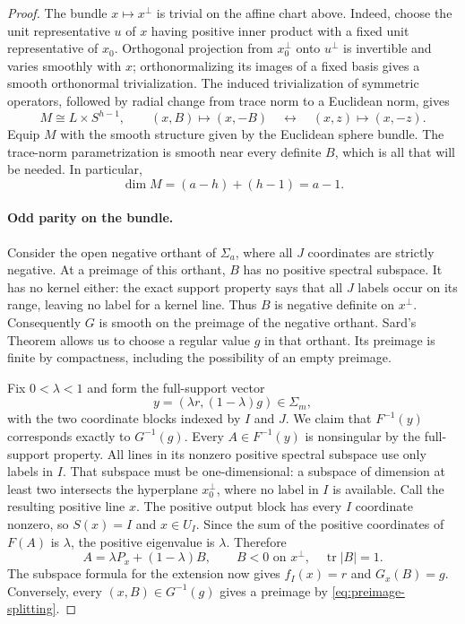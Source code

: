 \begin{proof}
The bundle $x\mapsto x^\perp$ is trivial on the affine chart above.
Indeed, choose the unit representative $u$ of $x$ having positive
inner product with a fixed unit representative of $x_0$.  Orthogonal
projection from $x_0^\perp$ onto $u^\perp$ is invertible and varies
smoothly with $x$; orthonormalizing its images of a fixed basis gives
a smooth orthonormal trivialization.  The induced trivialization
of symmetric operators, followed by radial change from trace norm
to a Euclidean norm, gives
\begin{equation}\label{eq:product-sphere-bundle}
 M\cong L\times S^{h-1},\qquad
 (x,B)\longmapsto(x,-B)\quad\leftrightarrow\quad(x,z)\longmapsto(x,-z).
\end{equation}
Equip $M$ with the smooth structure given by the Euclidean sphere
bundle.  The trace-norm parametrization is smooth near every
definite $B$, which is all that will be needed.  In particular,
\begin{equation}\label{eq:bundle-dimension}
 \dim M=(a-h)+(h-1)=a-1.
\end{equation}

\paragraph{Odd parity on the bundle.}
Consider the open negative orthant of $\Sigma_a$, where all $J$
coordinates are strictly negative.  At a preimage of this orthant,
$B$ has no positive spectral subspace.  It has no kernel either:
the exact support property says that all $J$ labels occur on its
range, leaving no label for a kernel line.  Thus $B$ is negative
definite on $x^\perp$.  Consequently $G$ is smooth on the preimage
of the negative orthant.  Sard's Theorem allows us to choose a
regular value $g$ in that orthant.  Its preimage is finite by
compactness, including the possibility of an empty preimage.

Fix $0<\lambda<1$ and form the full-support vector
\[
 y=(\lambda r,(1-\lambda)g)\in\Sigma_m,
\]
with the two coordinate blocks indexed by $I$ and $J$.  We claim
that $F^{-1}(y)$ corresponds exactly to $G^{-1}(g)$.
Every $A\in F^{-1}(y)$ is nonsingular by the full-support property.
All lines in its nonzero positive spectral subspace use only
labels in $I$.  That subspace must be one-dimensional: a subspace
of dimension at least two intersects the hyperplane $x_0^\perp$,
where no label in $I$ is available.  Call the resulting positive
line $x$.  The positive output block has every $I$ coordinate
nonzero, so $S(x)=I$ and $x\in U_I$.  Since the sum of the positive
coordinates of $F(A)$ is $\lambda$, the positive eigenvalue is
$\lambda$.  Therefore
\begin{equation}\label{eq:preimage-splitting}
 A=\lambda P_x+(1-\lambda)B,
 \qquad B<0\text{ on }x^\perp,\quad \operatorname{tr}|B|=1.
\end{equation}
The subspace formula for the extension now gives
$f_I(x)=r$ and $G_x(B)=g$.  Conversely, every $(x,B)\in G^{-1}(g)$
gives a preimage by \eqref{eq:preimage-splitting}.


\end{proof}
